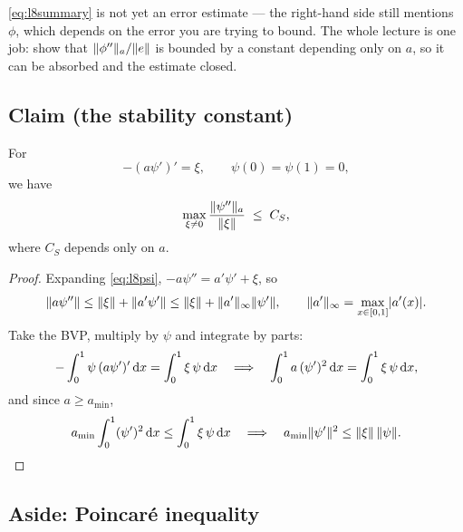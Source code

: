 \begin{intuition}
\eqref{eq:l8summary} is not yet an error estimate --- the right-hand side still
mentions $\phi$, which depends on the error you are trying to bound. The whole
lecture is one job: show that $\lVert\phi''\rVert_a/\lVert e\rVert$ is bounded by a
constant depending only on $a$, so it can be absorbed and the estimate closed.
\end{intuition}

\subsection*{Claim (the stability constant)}

\begin{theorem}\label{thm:l8claim}
For
\begin{equation}\label{eq:l8psi}
  -(a\psi')'=\xi,\qquad \psi(0)=\psi(1)=0,
\end{equation}
we have
\begin{equation}\label{eq:l8CS}
  \max_{\xi\neq0}\frac{\lVert\psi''\rVert_{a}}{\lVert\xi\rVert}\;\le\;C_{S},
\end{equation}
where $C_{S}$ depends only on $a$.
\end{theorem}

\begin{proof}
Expanding \eqref{eq:l8psi}, $-a\psi''=a'\psi'+\xi$, so
\begin{equation}\label{eq:l8start}
  \lVert a\psi''\rVert\le\lVert\xi\rVert+\lVert a'\psi'\rVert
                 \le\lVert\xi\rVert+\lVert a'\rVert_{\infty}\lVert\psi'\rVert,
  \qquad
  \lVert a'\rVert_{\infty}=\max_{x\in[0,1]}\lvert a'(x)\rvert .
\end{equation}
Take the BVP, multiply by $\psi$ and integrate by parts:
\begin{equation}\label{eq:l8parts}
  -\int_0^1\psi\,(a\psi')'\,\mathrm{d} x=\int_0^1\xi\,\psi\,\mathrm{d} x
  \quad\Longrightarrow\quad
  \int_0^1 a\,(\psi')^{2}\,\mathrm{d} x=\int_0^1\xi\,\psi\,\mathrm{d} x ,
\end{equation}
and since $a\ge a_{\min}$,
\begin{equation}\label{eq:l8amin}
  a_{\min}\int_0^1(\psi')^{2}\,\mathrm{d} x\le\int_0^1\xi\,\psi\,\mathrm{d} x
  \quad\Longrightarrow\quad
  a_{\min}\lVert\psi'\rVert^{2}\le\lVert\xi\rVert\,\lVert\psi\rVert .
\end{equation}
\end{proof}

\subsection*{Aside: Poincar\'e inequality}

